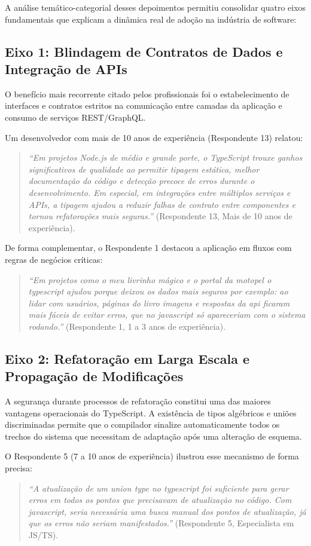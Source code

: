 A análise temático-categorial desses depoimentos permitiu consolidar quatro eixos fundamentais que explicam a dinâmica real de adoção na indústria de software:

\subsection{Eixo 1: Blindagem de Contratos de Dados e Integração de APIs}

O benefício mais recorrente citado pelos profissionais foi o estabelecimento de interfaces e contratos estritos na comunicação entre camadas da aplicação e consumo de serviços REST/GraphQL. 

Um desenvolvedor com mais de 10 anos de experiência (Respondente 13) relatou:
\begin{quote}
\textit{``Em projetos Node.js de médio e grande porte, o TypeScript trouxe ganhos significativos de qualidade ao permitir tipagem estática, melhor documentação do código e detecção precoce de erros durante o desenvolvimento. Em especial, em integrações entre múltiplos serviços e APIs, a tipagem ajudou a reduzir falhas de contrato entre componentes e tornou refatorações mais seguras.''} (Respondente 13, Mais de 10 anos de experiência).
\end{quote}

De forma complementar, o Respondente 1 destacou a aplicação em fluxos com regras de negócios críticas:
\begin{quote}
\textit{``Em projetos como o meu livrinho mágico e o portal da motopel o typescript ajudou porque deixou os dados mais seguros por exemplo: ao lidar com usuários, páginas do livro imagens e respostas da api ficaram mais fáceis de evitar erros, que no javascript só apareceriam com o sistema rodando.''} (Respondente 1, 1 a 3 anos de experiência).
\end{quote}

\subsection{Eixo 2: Refatoração em Larga Escala e Propagação de Modificações}

A segurança durante processos de refatoração constitui uma das maiores vantagens operacionais do TypeScript. A existência de tipos algébricos e uniões discriminadas permite que o compilador sinalize automaticamente todos os trechos do sistema que necessitam de adaptação após uma alteração de esquema.

O Respondente 5 (7 a 10 anos de experiência) ilustrou esse mecanismo de forma precisa:
\begin{quote}
\textit{``A atualização de um union type no typescript foi suficiente para gerar erros em todos os pontos que precisavam de atualização no código. Com javascript, seria necessária uma busca manual dos pontos de atualização, já que os erros não seriam manifestados.''} (Respondente 5, Especialista em JS/TS).
\end{quote}

